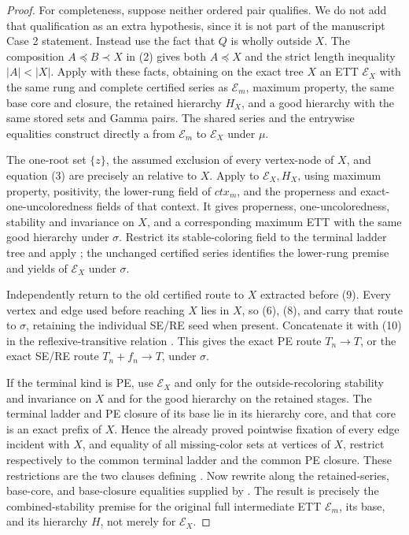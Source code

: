 \begin{proof}
For completeness, suppose neither ordered pair qualifies.  We do not
add that qualification as an extra
hypothesis, since it is not part of the manuscript Case 2 statement.
Instead use the fact that \(Q\) is wholly outside \(X\).  The composition
\(A\preccurlyeq B\prec X\) in (2) gives both \(A\preccurlyeq X\) and the
strict length inequality \(|A|<|X|\).  Apply
 with these facts, obtaining
on the exact tree \(X\) an ETT \(\mathcal E_X\) with the same rung and
complete certified series as \(\mathcal E_m\), maximum property, the same
base core and closure, the retained hierarchy \(H_X\), and a good
hierarchy with the same stored sets and Gamma pairs.  The shared series
and the entrywise equalities construct directly a
 from
\(\mathcal E_m\) to \(\mathcal E_X\) under \(\mu\).

The one-root set \(\{z\}\), the assumed exclusion of every vertex-node of
\(X\), and equation (3) are precisely an
 relative to \(X\).  Apply
 to \(\mathcal E_X,H_X\), using maximum
property, positivity, the lower-rung field of \(\mathit{ctx}_m\), and
the properness and exact-one-uncoloredness fields of that context.  It
gives properness, one-uncoloredness, stability and invariance on \(X\),
and a corresponding maximum ETT with the same good hierarchy under
\(\sigma\).  Restrict its stable-coloring field to the terminal ladder
tree and apply ; the unchanged certified series identifies
the lower-rung premise and yields
 of \(\mathcal E_X\) under \(\sigma\).

Independently return to the old certified route to \(X\) extracted before
(9).  Every vertex and edge used before reaching \(X\) lies in \(X\), so
(6), (8), and
 carry that route
to \(\sigma\), retaining the individual SE/RE seed when present.
Concatenate it with (10) in the reflexive-transitive relation
.  This gives the exact PE route
\(T_n\to T\), or the exact SE/RE route \(T_n+f_n\to T\), under \(\sigma\).

If the terminal kind is PE, use \(\mathcal E_X\) and
 only for the outside-recoloring stability and
invariance on \(X\) and for the good hierarchy on the retained stages.
The terminal ladder and PE closure of its base lie in its hierarchy core,
and that core is an exact prefix of \(X\).  Hence the already proved
pointwise fixation of every edge incident with \(X\), and equality of all
missing-color sets at vertices of \(X\), restrict respectively to the
common terminal ladder and the common PE closure.  These restrictions are
the two  clauses defining
.  Now rewrite along the retained-series,
base-core, and base-closure equalities supplied by
.  The result is precisely
the combined-stability premise for the original full intermediate ETT
\(\mathcal E_m\), its base, and its hierarchy \(H\), not merely for
\(\mathcal E_X\).


\end{proof}
